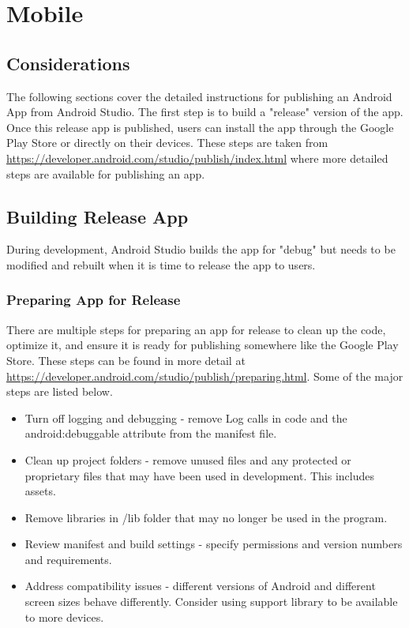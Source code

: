 
\section{Mobile}
\subsection{Considerations}
The following sections cover the detailed instructions for publishing an Android App from Android Studio. The first step is to build a "release" version of the app. Once this release app is published, users can install the app through the Google Play Store or directly on their devices. These steps are taken from \url{https://developer.android.com/studio/publish/index.html} where more detailed steps are available for publishing an app.

\subsection{Building Release App}
During development, Android Studio builds the app for "debug" but needs to be modified and rebuilt when it is time to release the app to users.
\subsubsection{Preparing App for Release}
There are multiple steps for preparing an app for release to clean up the code, optimize it, and ensure it is ready for publishing somewhere like the Google Play Store. These steps can be found in more detail at \url{https://developer.android.com/studio/publish/preparing.html}. Some of the major steps are listed below.
\begin{itemize}
    \item Turn off logging and debugging - remove Log calls in code and the android:debuggable attribute from the manifest file.
    \item Clean up project folders - remove unused files and any protected or proprietary files that may have been used in development. This includes assets.
    \item Remove libraries in /lib folder that may no longer be used in the program.
    \item Review manifest and build settings - specify permissions and version numbers and requirements.
    \item Address compatibility issues - different versions of Android and different screen sizes behave differently. Consider using support library to be available to more devices.
\end{itemize}
